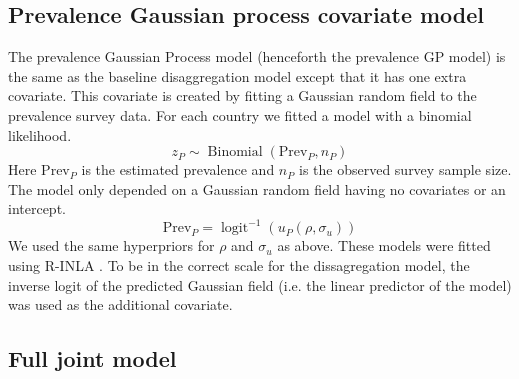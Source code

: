 \documentclass{statsoc}
\begin{document}
%
%
%
%
%
%
%

\subsection*{Prevalence Gaussian process covariate model}

The prevalence Gaussian Process model (henceforth the prevalence GP model) is the same as the baseline disaggregation model except that it has one extra covariate.
This covariate is created by fitting a Gaussian random field to the prevalence survey data.
For each country we fitted a model with a binomial likelihood.
$$z_P \sim \operatorname{Binomial}(\mathrm{Prev}_P, n_P) $$
Here $\mathrm{Prev}_P$ is the estimated prevalence and $n_P$ is the observed survey sample size. 
The model only depended on a Gaussian random field having no covariates or an intercept.
$$\mathrm{Prev}_P = \operatorname{logit}^{-1}(u_P(\rho, \sigma_u))$$
We used the same hyperpriors for $\rho$ and $\sigma_u$ as above. 
These models were fitted using R-INLA \citep{INLA}.
To be in the correct scale for the dissagregation model, the inverse logit of the predicted Gaussian field (i.e. the linear predictor of the model) was used as the additional covariate.

\subsection*{Full joint model}
\end{document}
